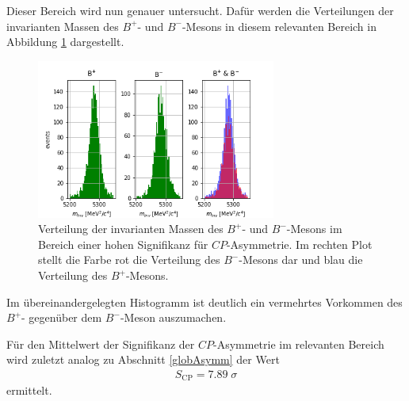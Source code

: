 Dieser Bereich wird nun genauer untersucht. Dafür werden die Verteilungen der invarianten Massen des $B^{+}$- und $B^{-}$-Mesons in diesem relevanten Bereich in Abbildung \ref{fig:AsymmMassen} dargestellt.
\begin{figure}
  \centering
  \includegraphics[width=0.7\textwidth]{plots/Bp_Bm_invarianteMasse.png}
  \caption{Verteilung der invarianten Massen des $B^{+}$- und $B^{-}$-Mesons im Bereich einer hohen Signifikanz für $CP$-Asymmetrie. Im rechten Plot stellt die Farbe rot die Verteilung des $B^{-}$-Mesons dar und blau die Verteilung des $B^{+}$-Mesons.}
  \label{fig:AsymmMassen}
\end{figure} 
\FloatBarrier
Im übereinandergelegten Histogramm ist deutlich ein vermehrtes Vorkommen des $B^{+}$- gegenüber dem $B^{-}$-Meson auszumachen.

Für den Mittelwert der Signifikanz der $CP$-Asymmetrie im relevanten Bereich wird zuletzt analog zu Abschnitt \ref{globAsymm} der Wert 
\begin{align}
  S_\mathrm{CP} = 7.89\;\sigma
\end{align}
ermittelt.


